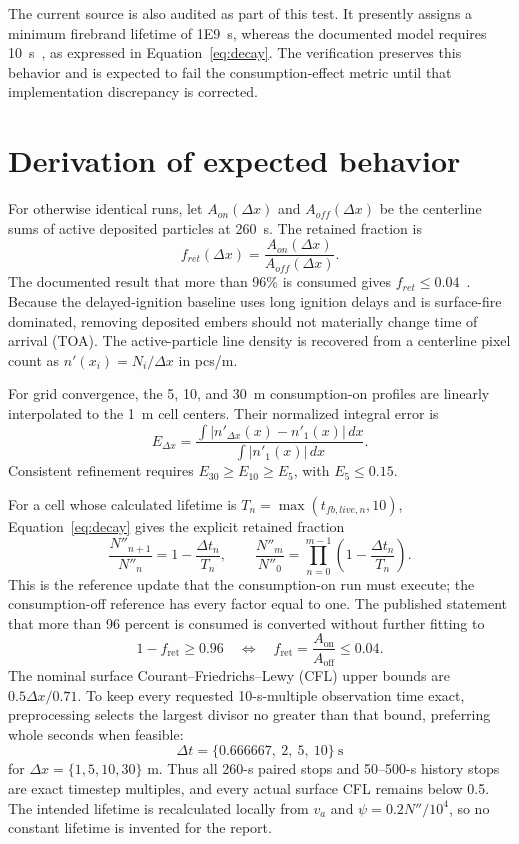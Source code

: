The current source is also audited as part of this test. It presently assigns
a minimum firebrand lifetime of 1E9~s, whereas the documented model requires
\SI{10}{s}~\cite{Qin2025}, as expressed in Equation~\ref{eq:decay}. The
verification preserves this behavior
and is expected to fail the consumption-effect metric until that implementation
discrepancy is corrected.

\section{Derivation of expected behavior}
For otherwise identical runs, let \(A_{on}(\Delta x)\) and
\(A_{off}(\Delta x)\) be the centerline sums of active deposited particles at
260~s. The retained fraction is
\begin{equation}
 f_{ret}(\Delta x)=\frac{A_{on}(\Delta x)}{A_{off}(\Delta x)}.
\end{equation}
The documented result that more than 96\% is consumed gives
\(f_{ret}\le0.04\)~\cite{Qin2025}. Because the delayed-ignition baseline uses
long ignition delays and is surface-fire dominated, removing deposited embers
should not materially change time of arrival (TOA). The active-particle line density is recovered from a
centerline pixel count as \(n'(x_i)=N_i/\Delta x\) in pcs/m.

For grid convergence, the 5, 10, and 30~m consumption-on profiles are linearly
interpolated to the 1~m cell centers. Their normalized integral error is
\begin{equation}
 E_{\Delta x}=\frac{\int|n'_{\Delta x}(x)-n'_1(x)|\,dx}
                         {\int|n'_1(x)|\,dx}.
\end{equation}
Consistent refinement requires \(E_{30}\ge E_{10}\ge E_5\), with
\(E_5\le0.15\).

For a cell whose calculated lifetime is \(T_n=\max(t_{fb,live,n},10)\),
Equation~\ref{eq:decay} gives the explicit retained fraction
\[
 \frac{N''_{n+1}}{N''_n}=1-\frac{\Delta t_n}{T_n},\qquad
 \frac{N''_m}{N''_0}=\prod_{n=0}^{m-1}
 \left(1-\frac{\Delta t_n}{T_n}\right).
\]
This is the reference update that the consumption-on run must execute; the
consumption-off reference has every factor equal to one.  The published
statement that more than 96 percent is consumed is converted without further
fitting to
\[
 1-f_{\mathrm{ret}}\geq0.96
 \quad\Longleftrightarrow\quad
 f_{\mathrm{ret}}=\frac{A_{\mathrm{on}}}{A_{\mathrm{off}}}\leq0.04.
\]
The nominal surface Courant--Friedrichs--Lewy (CFL) upper bounds are \(0.5\Delta x/0.71\). To keep every requested 10-s-multiple observation time exact, preprocessing selects the largest divisor no greater than that bound, preferring whole seconds when feasible:
\[
 \Delta t=\{0.666667,\ 2,\ 5,\ 10\}~\mathrm{s}
\]
for \(\Delta x=\{1,5,10,30\}\) m. Thus all 260-s paired stops and 50--500-s history stops are exact timestep multiples, and every actual surface CFL remains below 0.5. The intended lifetime is recalculated
locally from \(v_a\) and
\(\psi=0.2N''/10^4\), so no constant lifetime is invented for the report.

